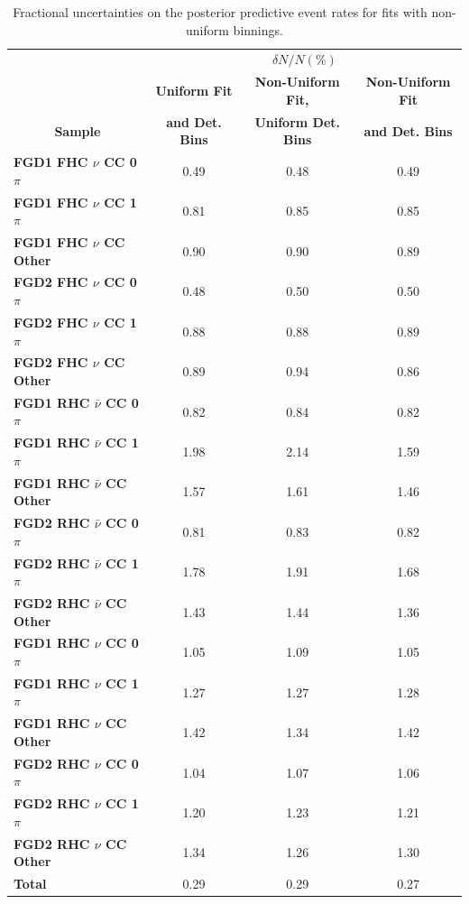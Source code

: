 \begin{center}
\begin{table}[!htbp]
\center
\begin{tabular}{l||c c c}
\hline \hline
& \multicolumn{3}{c}{$\delta N/N(\%)$}\\
& \multicolumn{1}{c}{\textbf{Uniform Fit}} & \multicolumn{1}{c}{\textbf{Non-Uniform Fit,}} & \multicolumn{1}{c}{\textbf{Non-Uniform Fit}}\\
\multicolumn{1}{c||}{\textbf{Sample}} & \multicolumn{1}{c}{\textbf{and Det. Bins}} & \multicolumn{1}{c}{\textbf{Uniform Det. Bins}} & \multicolumn{1}{c}{\textbf{and Det. Bins}}\\
\hline
\hline
\textbf{FGD1 FHC $\nu$ CC 0$\pi$} & 0.49 & 0.48 & 0.49\\
\textbf{FGD1 FHC $\nu$ CC 1$\pi$} & 0.81 & 0.85 & 0.85\\ 
\textbf{FGD1 FHC $\nu$ CC Other} & 0.90 & 0.90 & 0.89\\ \hline
\textbf{FGD2 FHC $\nu$ CC 0$\pi$} & 0.48 & 0.50 & 0.50\\
\textbf{FGD2 FHC $\nu$ CC 1$\pi$} & 0.88 & 0.88 & 0.89\\
\textbf{FGD2 FHC $\nu$ CC Other} & 0.89 & 0.94 & 0.86\\ \hline
\textbf{FGD1 RHC $\bar{\nu}$ CC 0$\pi$} & 0.82 & 0.84 & 0.82\\
\textbf{FGD1 RHC $\bar{\nu}$ CC 1$\pi$} & 1.98 & 2.14 & 1.59\\
\textbf{FGD1 RHC $\bar{\nu}$ CC Other} & 1.57 & 1.61 & 1.46\\ \hline
\textbf{FGD2 RHC $\bar{\nu}$ CC 0$\pi$} & 0.81 & 0.83 & 0.82\\
\textbf{FGD2 RHC $\bar{\nu}$ CC 1$\pi$} & 1.78 & 1.91 & 1.68\\
\textbf{FGD2 RHC $\bar{\nu}$ CC Other} & 1.43 & 1.44 & 1.36\\ \hline
\textbf{FGD1 RHC $\nu$ CC 0$\pi$} & 1.05 & 1.09 & 1.05\\
\textbf{FGD1 RHC $\nu$ CC 1$\pi$} & 1.27 & 1.27 & 1.28\\
\textbf{FGD1 RHC $\nu$ CC Other}& 1.42  & 1.34 & 1.42\\ \hline
\textbf{FGD2 RHC $\nu$ CC 0$\pi$} & 1.04 & 1.07 & 1.06\\
\textbf{FGD2 RHC $\nu$ CC 1$\pi$} & 1.20 & 1.23 & 1.21\\ 
\textbf{FGD2 RHC $\nu$ CC Other} & 1.34 & 1.26 & 1.30\\ \hline
\textbf{Total} & 0.29 & 0.29 & 0.27 \\ \hline\hline
\end{tabular}
\caption{Fractional uncertainties on the posterior predictive event rates for fits with non-uniform binnings.}
\label{tab:polyprederr}
\end{table}
\end{center}

